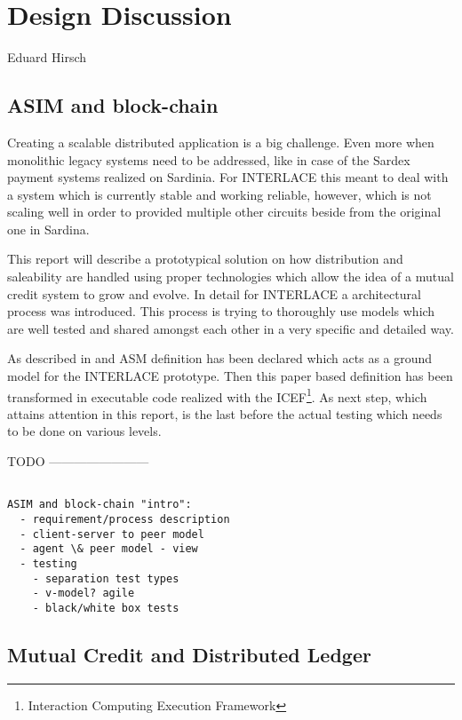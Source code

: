 \chapter{Design Discussion}
\label{ch:design}

\vspace{-1cm}
\begin{center}
Eduard Hirsch
\end{center}

\section{ASIM and block-chain}
\label{sec:asim}

Creating a scalable distributed application is a big challenge. Even more when monolithic legacy systems need to be addressed, like in case of the Sardex payment systems realized on Sardinia. For INTERLACE this meant to deal with a system which is currently stable and working reliable, however, which is not scaling well in order to provided multiple other circuits beside from the original one in Sardina.

This report will describe a prototypical solution on how distribution and saleability are handled using proper technologies which allow the idea of a mutual credit system to grow and evolve. In detail for INTERLACE a architectural process was introduced. This process is trying to thoroughly use models which are well tested and shared amongst each other in a very specific and detailed way.

As described in \cite{INTERLACE_D21} and ASM definition has been declared which acts as a ground model for the INTERLACE prototype. Then this paper based definition has been transformed in executable code realized with the ICEF\footnote{Interaction Computing Execution Framework}. As next step, which attains attention in this report, is the last before the actual testing which needs to be done on various levels.



TODO ------------------------

\begin{verbatim}

ASIM and block-chain "intro":
  - requirement/process description
  - client-server to peer model
  - agent \& peer model - view 
  - testing
    - separation test types
    - v-model? agile
    - black/white box tests
\end{verbatim}

\section{Mutual Credit and Distributed Ledger}
\label{sec:dlt} 

